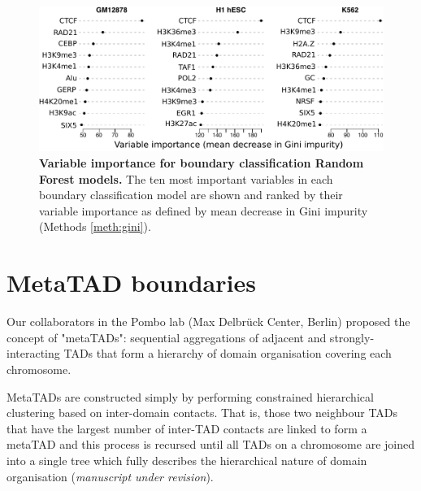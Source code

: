 \documentclass[a4paper,11pt,oneside]{book}
\begin{document}
\begin{figure}
\begin{center} 
\includegraphics[width=5.45in]{tadpred_varimp.pdf}
\captionsetup{width=\textwidth}
\caption[ Variable importance for boundary classification Random Forest models. ]{ {\bf Variable importance for boundary classification Random Forest models. }
The ten most important variables in each boundary classification model are shown and ranked by their variable importance as defined by mean decrease in Gini impurity (Methods \ref{meth:gini}).
}\label{fig:tadpred_varimp}
\end{center}
\end{figure} 

% 

\section{MetaTAD boundaries}\label{sec:metatads}

Our collaborators in the Pombo lab (Max Delbr\"{u}ck Center, Berlin) proposed the concept of "metaTADs": sequential aggregations of adjacent and strongly-interacting TADs that form a hierarchy of domain organisation covering each chromosome.

MetaTADs are constructed simply by performing constrained hierarchical clustering based on inter-domain contacts. That is, those two neighbour TADs that have the largest number of inter-TAD contacts are linked to form a metaTAD and this process is recursed until all TADs on a chromosome are joined into a single tree which fully describes the hierarchical nature of domain organisation (\emph{manuscript under revision}).
\end{document}
